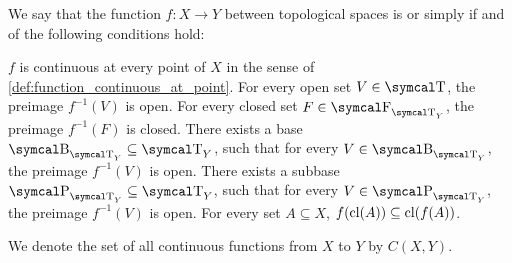 \begin{definition}\label{def:continuous_function}
  We say that the function \( f: X \to Y \) between topological spaces is  or simply  if and of the following conditions hold:
  \begin{defenum}
     \( f \) is continuous at every point of \( X \) in the sense of \cref{def:function_continuous_at_point}.
     For every open set \( V \in \CT \), the preimage \( f^{-1}(V) \) is open.
     For every closed set \( F \in \CF_{\CT_Y} \), the preimage \( f^{-1}(F) \) is closed.
     There exists a base \( \CB_{\CT_Y} \subseteq \CT_Y \), such that for every \( V \in \CB_{\CT_Y} \), the preimage \( f^{-1}(V) \) is open.
     There exists a subbase \( \CP_{\CT_Y} \subseteq \CT_Y \), such that for every \( V \in \CP_{\CT_Y} \), the preimage \( f^{-1}(V) \) is open.
     For every set \( A \subseteq X \), \( f(\operatorname{cl}(A)) \subseteq \operatorname{cl}(f(A)) \).
  \end{defenum}

  We denote the set of all continuous functions from \( X \) to \( Y \) by \( C(X, Y) \).
\end{definition}

